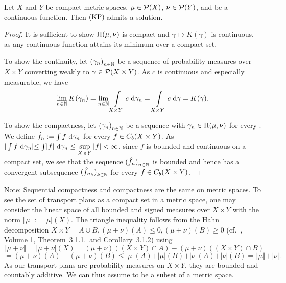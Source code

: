 \begin{lemma}\label{KPAdmitCompCont}
	Let $X$ and $Y$ be compact metric spaces, $\mu \in \PM{X}$, $\nu \in \PM{Y}$, and  be a continuous function. Then$\text{\normalfont\ (KP)\,}$admits a solution.
\end{lemma}

\begin{proof}
	It is sufficient to show $\TP{\mu}{\nu}$ is compact and $\gamma \mapsto K(\gamma)$ is continuous, as any continuous function attains its minimum over a compact set.

	To show the continuity, let ${(\gamma_n)}_{\NinN}$ be a sequence of probability measures over $X \times Y$ converting weakly to $\gamma \in \PM{X \times Y}$. As $c$ is continuous and especially measurable, we have
	\[ \lim\limits_{\NinN} K(\gamma_n) = \lim\limits_{\NinN} \int\limits_{X \times Y} c~\D[\gamma_n] = \int\limits_{X \times Y} c~\D[\gamma] = K(\gamma). \] 
	
	To show the compactness, let ${(\gamma_n)}_{\NinN}$ be a sequence with $\gamma_n \in \TP{\mu}{\nu}$ for every \NinN. We define $\hat{f}_n := \int f~\D[\gamma_n]$ for every $f \in \CF[b]{X \times Y}$. As $\rvert \int f~\D[\gamma_n] \lvert \le \int \lvert f \rvert~\D[\gamma_n] \le \sup\limits_{X \times Y} |f| < \infty$, since $f$ is bounded and continuous on a compact set, we see that the sequence ${(\hat{f}_n)}_{\NinN}$ is bounded and hence has a convergent subsequence ${(\hat{f}_{n_k})}_{\NinN[k]}$ for every $f \in \CF[b]{X \times Y}$.
\end{proof}

Note: Sequential compactness and compactness are the same on metric spaces. To see the set of transport plans as a compact set in a metric space, one may consider the linear space of all bounded and signed measures over $X \times Y$ with the norm $\Vert \mu \Vert := |\mu|(X)$. The triangle inequality follows from the Hahn decomposition $X \times Y = A \dot{\cup} B, (\mu + \nu)(A) \le 0, (\mu + \nu)(B) \ge 0$ (cf.~\cite{Bog2007}, Volume 1, Theorem~3.1.1.~and Corollary~3.1.2) using
\[ \Vert \mu + \nu \Vert = \vert \mu + \nu \vert (X) = (\mu + \nu)((X \times Y) \cap A) - (\mu + \nu)((X \times Y) \cap B) \]
\[ = (\mu + \nu)(A) - (\mu + \nu)(B) \le \vert \mu \vert (A) + \vert \mu \vert (B) + \vert \nu \vert (A) + \vert \nu \vert (B) = \Vert \mu \Vert + \Vert \nu \Vert. \]
As our transport plans are probability measures on $X \times Y$, they are bounded and countably additive. We can thus assume \TP{\mu}{\nu} to be a subset of a metric space.


